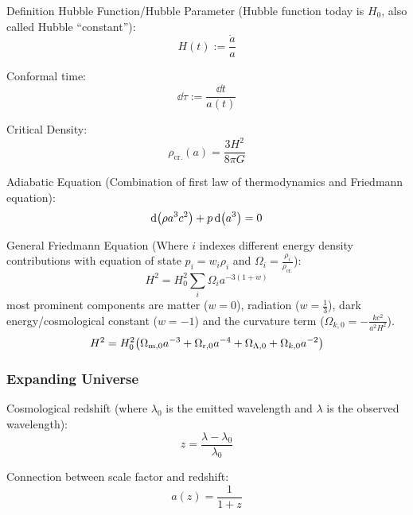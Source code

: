 			\noindent
			Definition Hubble Function/Hubble Parameter{} (Hubble function today is $H_0$, also called Hubble ``constant''):
			\begin{equation}
				H(t) := \frac{\dot{a}}{a}
			\end{equation}

			\noindent
			Conformal time:
			\begin{equation}
				\dd \tau := \frac{\dd t}{a(t)}
			\end{equation}

			\noindent
			Critical Density:
			\begin{equation}
				\rho_\text{cr.} (a) = \frac{3 H^2}{8 \pi G}
			\end{equation}

			\noindent
			Adiabatic Equation (Combination of first law of thermodynamics and Friedmann equation):
			\begin{equation}
				\dd \qty(\rho a^3 c^2) + p \dd (a^3) = 0
			\end{equation}

			\noindent
			General Friedmann Equation (Where $i$ indexes different energy density contributions with equation of state $p_i = w_i \rho_i$ and $\Omega_i = \frac{\rho_i}{\rho_\text{cr.}}$):
			\begin{equation}
				H^2 = H_0^2\sum_i \Omega_i a^{-3(1+w)}
			\end{equation}
			most prominent components are matter ($w=0$), radiation ($w=\frac{1}{3}$), dark energy/cosmological constant ($w=-1$) and the curvature term ($\Omega_{k,0}=-\frac{k c^2}{a^2 H^2}$).
			\begin{equation}
				H^2 = H_0^2 \qty(\Omega_{\text{m},0} a^{-3} + \Omega_{\text{r},0} a^{-4} + \Omega_{\Lambda,0} + \Omega_{k,0} a^{-2})
			\end{equation}


		\subsubsection{Expanding Universe}
			Cosmological redshift (where $\lambda_0$ is the emitted wavelength and $\lambda$ is the observed wavelength):
			\begin{equation}
				z = \frac{\lambda - \lambda_0}{\lambda_0}
			\end{equation}

			\noindent
			Connection between scale factor and redshift:
			\begin{equation}
				a(z) = \frac{1}{1+z}
			\end{equation}